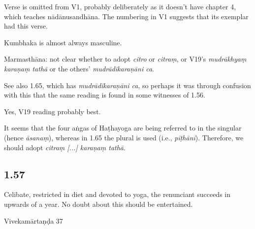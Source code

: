 \begin{ekdosis}
\begin{testimonia}[hp01_056]
\end{testimonia}

\begin{philcomm}[hp01_056]
Verse is omitted from V1, probably deliberately as it doesn’t have chapter 4, which teaches nādānusandhāna. The numbering in V1 suggests that its exemplar had this verse.

Kumbhaka is almost always masculine.

Marmasthāna: not clear whether to adopt \emph{citro} or \emph{citraṃ}, or V19’s \emph{mudrākhyaṃ karaṇaṃ tathā} or the others’ \emph{mudrādikaraṇāni ca}.

See also 1.65, which has \emph{mudrādikaraṇāni ca}, so perhaps it was through confusion with this that the same reading is found in some witnesses of 1.56.

Yes, V19 reading probably best.

\begin{versinnote}
\end{versinnote}

It seems that the four aṅgas of Haṭhayoga are being referred to in the singular (hence \emph{āsanaṃ}), whereas in 1.65 the plural is used (i.e., \emph{pīṭhāni}). Therefore, we should adopt \emph{citraṃ [...] karaṇaṃ tathā}.
\end{philcomm}

\subsection*{1.57}
\begin{translation}[hp01_057]
Celibate, restricted in diet and devoted to yoga, the renunciant succeeds in upwards of a year. No doubt about this should be entertained.
\end{translation}

\begin{sources}[hp01_057]
Vivekamārtaṇḍa 37

\begin{versinnote}
\end{versinnote}

\end{sources}


\end{ekdosis}
